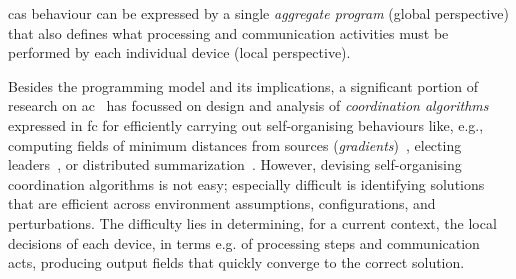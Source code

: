 \begin{comment}
In this work,
 we consider \emph{\ac{ac}}~\cite{DBLP:journals/computer/BealPV15}, a prominent \emph{field-based coordination} approach~\cite{DBLP:journals/jlap/ViroliBDACP19} 
promoting macro-programming 
 by capturing \ac{cas} behaviours 
 as functions operating on \emph{computational fields}~\cite{DBLP:journals/jlap/ViroliBDACP19},
 in a system model of neighbour-interacting devices
 operating in asynchronous sense-compute-interact rounds.
%
A computational field is a macro-abstraction
 that maps a set of devices over time to computational values.
%
\ac{ac} is based on the \emph{\ac{fc}}~\cite{DBLP:journals/jlap/ViroliBDACP19}, or variants thereof,
 that define constructs for manipulating and evolving fields.
%
\end{comment}
\ac{cas} behaviour
 can be expressed by a single \emph{aggregate program} (global perspective)
 that also defines 
 what processing and communication activities
 must be performed by each individual device (local perspective).

Besides the programming model and its implications,
 a significant portion of research on \ac{ac}~\cite{DBLP:journals/jlap/ViroliBDACP19} has focussed
 on design and analysis of \emph{coordination algorithms} expressed in \ac{fc}
 for efficiently carrying out self-organising behaviours
 like, e.g., computing fields of minimum distances from sources (\emph{gradients})~\cite{DBLP:conf/ipsn/NagpalSB03,DBLP:journals/pervasive/MameiZL04,DBLP:conf/saso/AudritoCDV17},
 electing leaders~\cite{DBLP:conf/saso/MoBD18},
 or %
 distributed summarization~\cite{DBLP:journals/cee/AudritoCDPV21}.
%
However, devising self-organising coordination algorithms is not easy; especially difficult is identifying solutions
 that are efficient across environment assumptions, configurations, and perturbations.
%
The difficulty lies in determining, 
 for a current context,
 the local decisions of each device, 
 in terms e.g. of processing steps and communication acts,
 producing output fields that quickly converge to the correct solution.

